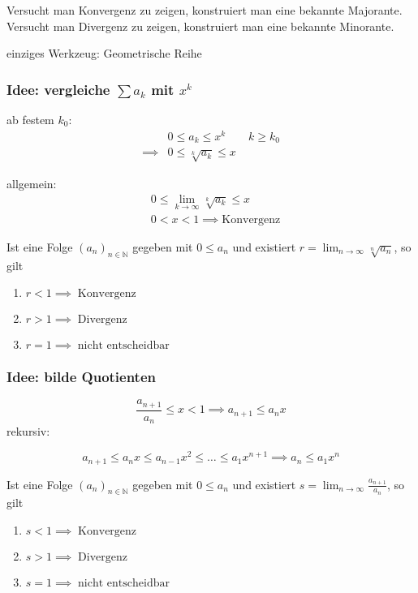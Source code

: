 Versucht man Konvergenz zu zeigen, konstruiert man eine bekannte Majorante.\newline
Versucht man Divergenz zu zeigen, konstruiert man eine bekannte Minorante. \newline

\noindent einziges Werkzeug: Geometrische Reihe

\subsubsection*{Idee: vergleiche $ \sum a_k $ mit $x^k$}
ab festem \( k_0 \):
\begin{align*}
	&0 \leq a_k \leq x^k \qquad k \geq k_0 \\
	\implies &0 \leq \sqrt[k]{a_k} \leq x
\end{align*}

\noindent allgemein:
\begin{align*}
	&0 \leq \lim_{k\rightarrow\infty} \sqrt[k]{a_k} \leq x \\
	&0 < x < 1 \implies \text{Konvergenz}
\end{align*}

\begin{theorem}[Wurzelkriterium]
		Ist eine Folge \( (a_n)_{n \in \mathbb{N}} \) gegeben mit \( 0 \leq a_n \) und existiert \( r = \lim_{n\rightarrow\infty} \sqrt[n]{a_n} \), so gilt
		\begin{enumerate}
			\item \( r < 1 \implies \; \text{Konvergenz} \)
			\item \( r > 1 \implies \; \text{Divergenz} \)
			\item \( r = 1 \implies \; \text{nicht entscheidbar} \)
		\end{enumerate}
\end{theorem}

\subsubsection*{Idee: bilde Quotienten} %
\label{sub:bilde_quotienten}

\[
	\frac{a_{n+1}}{a_n} \leq x < 1 \implies a_{n+1} \leq a_n x
\]
rekursiv:

\[
	a_{n+1} \leq a_nx \leq a_{n-1}x^2\leq \ldots \leq a_1x^{n+1} \implies a_n \leq a_1x^n
\]

\begin{theorem}[Quotientenkriterium]
	Ist eine Folge \( (a_n)_{n \in \mathbb{N} } \) gegeben mit \( 0 \leq a_n \) und existiert \( s = \lim_{n\rightarrow\infty} \frac{a_{n+1}}{a_n} \), so gilt
	\begin{enumerate}
		\item \( s < 1 \implies \; \text{Konvergenz} \)
		\item \( s > 1 \implies \; \text{Divergenz} \)
		\item \( s = 1 \implies \; \text{nicht entscheidbar} \)
	\end{enumerate}
\end{theorem}

